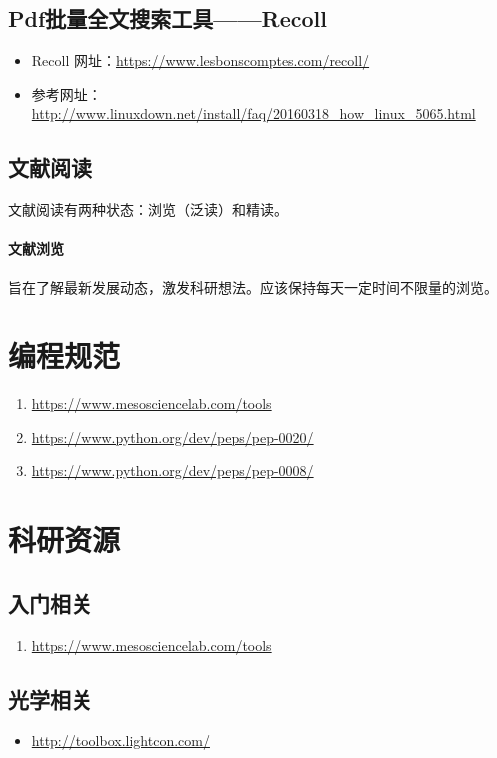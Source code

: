 \subsection{Pdf批量全文搜索工具——Recoll}
\begin{itemize}
\item Recoll 网址：\url{https://www.lesbonscomptes.com/recoll/}

\item 参考网址：\url{http://www.linuxdown.net/install/faq/20160318_how_linux_5065.html}
\end{itemize}


\subsection{文献阅读}
文献阅读有两种状态：浏览（泛读）和精读。

\paragraph{文献浏览}旨在了解最新发展动态，激发科研想法。应该保持每天一定时间不限量的浏览。



\section{编程规范}
\begin{enumerate}
\item \url{https://www.mesosciencelab.com/tools}

\item \url{https://www.python.org/dev/peps/pep-0020/}

\item \url{https://www.python.org/dev/peps/pep-0008/}
\end{enumerate}



\section{科研资源}
\subsection{入门相关}
\begin{enumerate}
\item \url{https://www.mesosciencelab.com/tools}
\end{enumerate}


\subsection{光学相关}
 \begin{itemize}
\item \url{http://toolbox.lightcon.com/}
\end{itemize}


